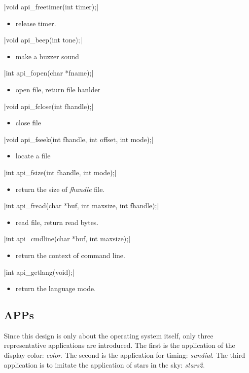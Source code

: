\documentclass{swfcthesis}
\begin{document}
\csingle|void api_freetimer(int timer);|
\begin{itemize}
\item release timer.
\end{itemize}

\csingle|void api_beep(int tone);|
\begin{itemize}
\item make a buzzer sound
\end{itemize}

\csingle|int api_fopen(char *fname);|
\begin{itemize}
\item open file, return file hanlder
\end{itemize}

\csingle|void api_fclose(int fhandle);|
\begin{itemize}
\item close file
\end{itemize}

\csingle|void api_fseek(int fhandle, int offset, int mode);|
\begin{itemize}
\item locate a file
\end{itemize}

\csingle|int api_fsize(int fhandle, int mode);|
\begin{itemize}
\item return the size of \emph{fhandle} file.
\end{itemize}

\csingle|int api_fread(char *buf, int maxsize, int fhandle);|
\begin{itemize}
\item read file, return read bytes. 
\end{itemize}

\csingle|int api_cmdline(char *buf, int maxsize);|
\begin{itemize}
\item return the context of command line.
\end{itemize}

\csingle|int api_getlang(void);|
\begin{itemize}
\item return the language mode.
\end{itemize}

\subsection{APPs}
\label{sec:apps-1}
Since this design is only about the operating system itself, only three representative
applications are introduced. The first is the application of the display color:
\emph{color}. The second is the application for timing: \emph{sundial}. The third
application is to imitate the application of stars in the sky: \emph{stars2}.
\end{document}
